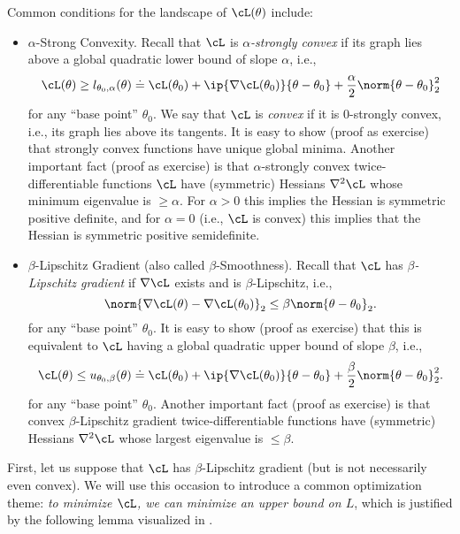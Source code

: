 \documentclass[../../book-main.tex]{subfiles}
\begin{document}
Common conditions for the landscape of \(\cL(\theta)\) include:
\begin{itemize}
    \item \(\alpha\)-Strong Convexity. Recall that \(\cL\) is \textit{\(\alpha\)-strongly convex} if its graph lies above a global quadratic lower bound of slope \(\alpha\), i.e.,
    \begin{equation}
        \cL(\theta) \geq l_{\theta_{0}, \alpha}(\theta) \doteq \cL(\theta_{0}) + \ip{\nabla \cL(\theta_{0})}{\theta - \theta_{0}} + \frac{\alpha}{2}\norm{\theta - \theta_{0}}_{2}^{2}
    \end{equation}
    for any ``base point'' \(\theta_{0}\). We say that \(\cL\) is \textit{convex} if it is \(0\)-strongly convex, i.e., its graph lies above its tangents. It is easy to show (proof as exercise) that strongly convex functions have unique global minima. Another important fact (proof as exercise) is that \(\alpha\)-strongly convex twice-differentiable functions \(\cL\) have (symmetric) Hessians \(\nabla^{2}\cL\) whose minimum eigenvalue is \(\geq \alpha\). For \(\alpha > 0\) this implies the Hessian is symmetric positive definite, and for \(\alpha = 0\) (i.e., \(\cL\) is convex) this implies that the Hessian is symmetric positive semidefinite.
    \item \(\beta\)-Lipschitz Gradient (also called \(\beta\)-Smoothness). Recall that \(\cL\) has \textit{\(\beta\)-Lipschitz gradient} if \(\nabla \cL\) exists and is \(\beta\)-Lipschitz, i.e.,
    \begin{equation}
        \norm{\nabla \cL(\theta) - \nabla \cL(\theta_{0})}_{2} \leq \beta \norm{\theta - \theta_{0}}_{2}.
    \end{equation}
    for any ``base point'' \(\theta_{0}\).  It is easy to show (proof as exercise) that this is equivalent to \(\cL\) having a global quadratic upper bound of slope \(\beta\), i.e.,
    \begin{equation}
        \cL(\theta) \leq u_{\theta_{0}, \beta}(\theta) \doteq \cL(\theta_{0}) + \ip{\nabla \cL(\theta_{0})}{\theta - \theta_{0}} + \frac{\beta}{2}\norm{\theta - \theta_{0}}_{2}^{2}.
    \end{equation}
    for any ``base point'' \(\theta_{0}\).  Another important fact (proof as exercise) is that convex \(\beta\)-Lipschitz gradient twice-differentiable functions have (symmetric) Hessians \(\nabla^{2}\cL\) whose largest eigenvalue is \(\leq \beta\).
\end{itemize}
First, let us suppose that \(\cL\) has \(\beta\)-Lipschitz gradient (but is not necessarily even convex). We will use this occasion to introduce a common optimization theme: \textit{to minimize \(\cL\), we can minimize an upper bound on \(L\)}, which is justified by the following lemma visualized in .
\end{document}
